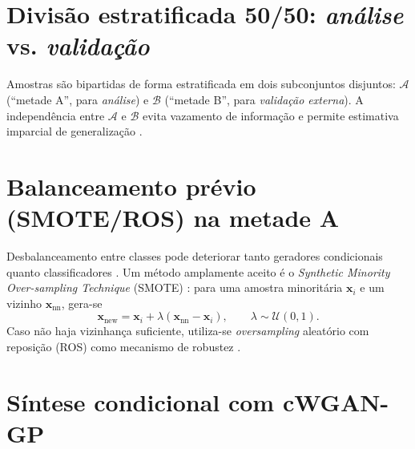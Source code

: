\documentclass[12pt,a4paper]{report}
\begin{document}
\section{Divisão estratificada 50/50: \emph{análise} vs. \emph{validação}}

Amostras são bipartidas de forma estratificada em dois subconjuntos disjuntos: $\mathcal{A}$ (``metade A'', para \emph{análise}) e $\mathcal{B}$ (``metade B'', para \emph{validação externa}). A independência entre $\mathcal{A}$ e $\mathcal{B}$ evita vazamento de informação e permite estimativa imparcial de generalização \cite{Prechelt1998EarlyStopping}.

\section{Balanceamento prévio (SMOTE/ROS) na metade A}
\label{sec:smote}

Desbalanceamento entre classes pode deteriorar tanto geradores condicionais quanto classificadores \cite{He2009Imbalance}. Um método amplamente aceito é o \emph{Synthetic Minority Over-sampling Technique} (SMOTE) \cite{Chawla2002SMOTE}: para uma amostra minoritária $\mathbf{x}_i$ e um vizinho $\mathbf{x}_{\text{nn}}$, gera-se
\begin{equation}
\mathbf{x}_{\text{new}}=\mathbf{x}_i + \lambda\left(\mathbf{x}_{\text{nn}}-\mathbf{x}_i\right),\qquad \lambda\sim \mathcal{U}(0,1).
\end{equation}
Caso não haja vizinhança suficiente, utiliza-se \emph{oversampling} aleatório com reposição (ROS) como mecanismo de robustez \cite{He2009Imbalance}.

\section{Síntese condicional com cWGAN-GP}
\label{sec:cwgan}
\end{document}
